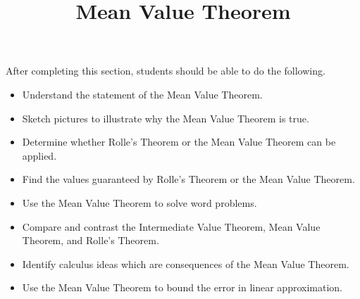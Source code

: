 \documentclass{ximera}
\title{Mean Value Theorem}
\begin{document}
\begin{abstract}
\end{abstract}

\maketitle

\begin{sectionOutcomes}

After completing this section, students should be able to do the following.

\begin{itemize}
\item Understand the statement of the Mean Value Theorem.
\item Sketch pictures to illustrate why the Mean Value Theorem is true.
\item Determine whether Rolle's Theorem or the Mean Value Theorem can be applied.
\item Find the values guaranteed by Rolle's Theorem or the Mean Value Theorem.
\item Use the Mean Value Theorem to solve word problems.
\item Compare and contrast the Intermediate Value Theorem, Mean Value Theorem, and Rolle's Theorem.
\item Identify calculus ideas which are consequences of the Mean Value Theorem.
\item Use the Mean Value Theorem to bound the error in linear approximation.
\end{itemize}

\end{sectionOutcomes}
\end{document}
